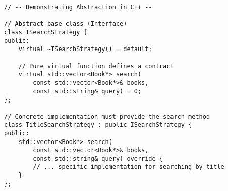 \begin{verbatim}
// -- Demonstrating Abstraction in C++ --

// Abstract base class (Interface)
class ISearchStrategy {
public:
    virtual ~ISearchStrategy() = default;
    
    // Pure virtual function defines a contract
    virtual std::vector<Book*> search(
        const std::vector<Book*>& books,
        const std::string& query) = 0;
};

// Concrete implementation must provide the search method
class TitleSearchStrategy : public ISearchStrategy {
public:
    std::vector<Book*> search(
        const std::vector<Book*>& books,
        const std::string& query) override {
        // ... specific implementation for searching by title
    }
};
\end{verbatim}